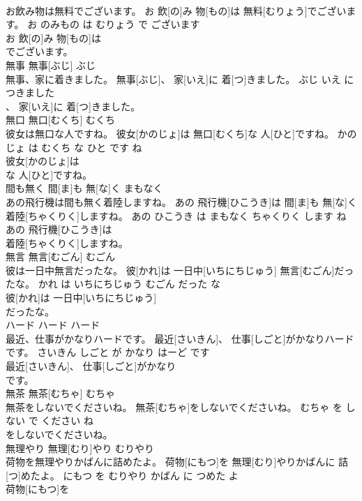 \documentclass[8pt]{extreport}
\begin{document}
\begin{CJK}{UTF8}{min}
\\	お飲み物は無料でございます。	お 飲[の]み 物[もの]は 無料[むりょう]でございます。	お のみもの は むりょう で ございます	
\\	お 飲[の]み 物[もの]は
\\	でございます。			
\\	無事	無事[ぶじ]	ぶじ	
\\	無事、家に着きました。	無事[ぶじ]、 家[いえ]に 着[つ]きました。	ぶじ いえ に つきました	
\\	、 家[いえ]に 着[つ]きました。			
\\	無口	無口[むくち]	むくち	
\\	彼女は無口な人ですね。	彼女[かのじょ]は 無口[むくち]な 人[ひと]ですね。	かのじょ は むくち な ひと です ね	
\\	彼女[かのじょ]は
\\	な 人[ひと]ですね。			
\\	間も無く	間[ま]も 無[な]く	まもなく	
\\	あの飛行機は間も無く着陸しますね。	あの 飛行機[ひこうき]は 間[ま]も 無[な]く 着陸[ちゃくりく]しますね。	あの ひこうき は まもなく ちゃくりく します ね	
\\	あの 飛行機[ひこうき]は
\\	着陸[ちゃくりく]しますね。			
\\	無言	無言[むごん]	むごん	
\\	彼は一日中無言だったな。	彼[かれ]は 一日中[いちにちじゅう] 無言[むごん]だったな。	かれ は いちにちじゅう むごん だった な	
\\	彼[かれ]は 一日中[いちにちじゅう]
\\	だったな。			
\\	ハード	ハード	ハード	
\\	最近、仕事がかなりハードです。	最近[さいきん]、 仕事[しごと]がかなりハードです。	さいきん しごと が かなり はーど です	
\\	最近[さいきん]、 仕事[しごと]がかなり
\\	です。			
\\	無茶	無茶[むちゃ]	むちゃ	
\\	無茶をしないでくださいね。	無茶[むちゃ]をしないでくださいね。	むちゃ を しない で ください ね	
\\	をしないでくださいね。			
\\	無理やり	無理[むり]やり	むりやり	
\\	荷物を無理やりかばんに詰めたよ。	荷物[にもつ]を 無理[むり]やりかばんに 詰[つ]めたよ。	にもつ を むりやり かばん に つめた よ	
\\	荷物[にもつ]を

\end{CJK}
\end{document}
